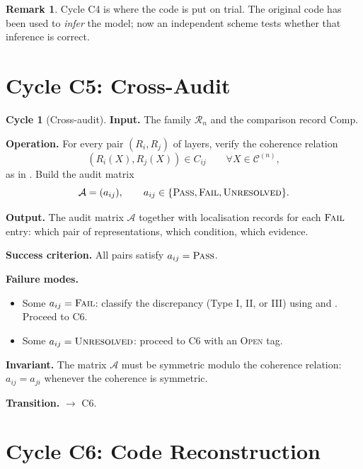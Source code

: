\documentclass[11pt,a4paper]{article}
\theoremstyle{definition}
\newtheorem{cycle}{Cycle}[section]
\newtheorem{remark}[definition]{Remark}
\theoremstyle{plain}
\newcommand{\Ccal}{\mathcal{C}}
\newcommand{\Rcal}{\mathcal{R}}
\newcommand{\Acal}{\mathcal{A}}
\newcommand{\STPASS}{\textsc{Pass}}
\newcommand{\STFAIL}{\textsc{Fail}}
\newcommand{\STUNRES}{\textsc{Unresolved}}
\begin{document}
\begin{remark}
Cycle C4 is where the code is put on trial. The original code has
been used to \emph{infer} the model; now an independent scheme tests
whether that inference is correct.
\end{remark}

\section{Cycle C5: Cross-Audit}
\label{sec:c5}

\begin{cycle}[Cross-audit]\label{cy:c5}
\textbf{Input.} The family $\Rcal_n$ and the comparison record
$\mathrm{Comp}$.

\medskip
\textbf{Operation.} For every pair $(R_i, R_j)$ of layers, verify
the coherence relation
\[
  (R_i(X), R_j(X)) \in C_{ij}
  \qquad \forall X \in \Ccal^{(n)},
\]
as in \cite[Definition 4.1]{paperII}. Build the audit matrix
\[
  \Acal = (a_{ij}), \qquad a_{ij} \in
  \{\STPASS, \STFAIL, \STUNRES\}.
\]

\medskip
\textbf{Output.} The audit matrix $\Acal$ together with
localisation records for each $\STFAIL$ entry: which pair of
representations, which condition, which evidence.

\medskip
\textbf{Success criterion.} All pairs satisfy
$a_{ij} = \STPASS$.

\medskip
\textbf{Failure modes.}
\begin{itemize}
  \item Some $a_{ij} = \STFAIL$: classify the discrepancy
        (Type I, II, or III) using \cite[Theorem 4.3]{paperI} and
        \cite[\S3]{paperII}. Proceed to C6.
  \item Some $a_{ij} = \STUNRES$: proceed to C6 with an \textsc{Open}
        tag.
\end{itemize}

\medskip
\textbf{Invariant.} The matrix $\Acal$ must be symmetric modulo the
coherence relation: $a_{ij} = a_{ji}$ whenever the coherence is
symmetric.

\medskip
\textbf{Transition.} $\to$ C6.
\end{cycle}

\section{Cycle C6: Code Reconstruction}
\label{sec:c6}
\end{document}
